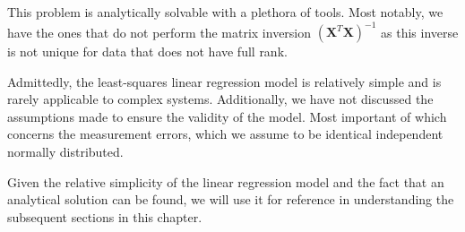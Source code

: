  \noindent This problem is analytically solvable with a plethora of tools. Most notably, we have the ones that do not perform the matrix inversion $(\boldsymbol{X}^T \boldsymbol{X})^{-1}$ as this inverse is not unique for data that does not have full rank.

Admittedly, the least-squares linear regression model is relatively simple and is rarely applicable to complex systems. Additionally, we have not discussed the assumptions made to ensure the validity of the model. Most important of which concerns the measurement errors, which we assume to be identical independent normally distributed.

Given the relative simplicity of the linear regression model and the fact that an analytical solution can be found, we will use it for reference in understanding the subsequent sections in this chapter.


